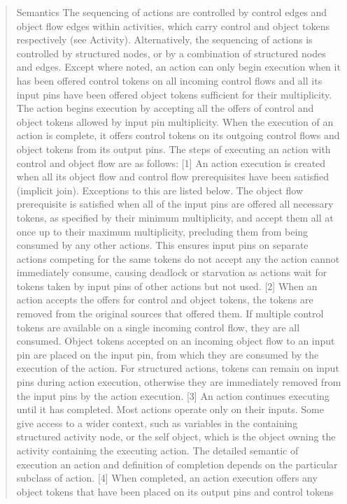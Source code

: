 \begin{quotation}
Semantics
The sequencing of actions are controlled by control edges and object flow edges within activities, which carry control and
object tokens respectively (see Activity). Alternatively, the sequencing of actions is controlled by structured nodes, or by
a combination of structured nodes and edges. Except where noted, an action can only begin execution when it has been
offered control tokens on all incoming control flows and all its input pins have been offered object tokens sufficient for
their multiplicity. The action begins execution by accepting all the offers of control and object tokens allowed by input
pin multiplicity. When the execution of an action is complete, it offers control tokens on its outgoing control flows and
object tokens from its output pins.
The steps of executing an action with control and object flow are as follows:
[1] An action execution is created when all its object flow and control flow prerequisites have been satisfied (implicit join).
Exceptions to this are listed below. The object flow prerequisite is satisfied when all of the input pins are offered all
necessary tokens, as specified by their minimum multiplicity, and accept them all at once up to their maximum
multiplicity, precluding them from being consumed by any other actions. This ensures input pins on separate actions
competing for the same tokens do not accept any the action cannot immediately consume, causing deadlock or starvation
as actions wait for tokens taken by input pins of other actions but not used.
[2] When an action accepts the offers for control and object tokens, the tokens are removed from the original sources that
offered them. If multiple control tokens are available on a single incoming control flow, they are all consumed. Object
tokens accepted on an incoming object flow to an input pin are placed on the input pin, from which they are consumed by
the execution of the action. For structured actions, tokens can remain on input pins during action execution, otherwise
they are immediately removed from the input pins by the action execution.
[3] An action continues executing until it has completed. Most actions operate only on their inputs. Some give access to a
wider context, such as variables in the containing structured activity node, or the self object, which is the object owning
the activity containing the executing action. The detailed semantic of execution an action and definition of completion
depends on the particular subclass of action.
[4] When completed, an action execution offers any object tokens that have been placed on its output pins and control tokens

\end{quotation}
